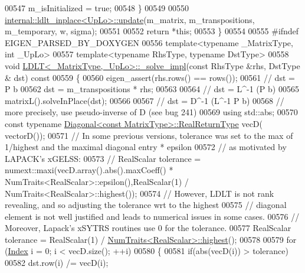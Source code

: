 \begin{DoxyCode}
00547     m\_isInitialized = \textcolor{keyword}{true};
00548   \}
00549 
00550   \hyperlink{struct_eigen_1_1internal_1_1ldlt__inplace}{internal::ldlt\_inplace<UpLo>::update}(m\_matrix, m\_transpositions, 
      m\_temporary, w, sigma);
00551 
00552   \textcolor{keywordflow}{return} *\textcolor{keyword}{this};
00553 \}
00554 
00555 \textcolor{preprocessor}{#ifndef EIGEN\_PARSED\_BY\_DOXYGEN}
00556 \textcolor{keyword}{template}<\textcolor{keyword}{typename} \_MatrixType, \textcolor{keywordtype}{int} \_UpLo>
00557 \textcolor{keyword}{template}<\textcolor{keyword}{typename} RhsType, \textcolor{keyword}{typename} DstType>
00558 \textcolor{keywordtype}{void} \hyperlink{group___cholesky___module_class_eigen_1_1_l_d_l_t}{LDLT<\_MatrixType,\_UpLo>::\_solve\_impl}(\textcolor{keyword}{const} RhsType &rhs, DstType &
      dst)\textcolor{keyword}{ const}
00559 \textcolor{keyword}{}\{
00560   eigen\_assert(rhs.rows() == rows());
00561   \textcolor{comment}{// dst = P b}
00562   dst = m\_transpositions * rhs;
00563 
00564   \textcolor{comment}{// dst = L^-1 (P b)}
00565   matrixL().solveInPlace(dst);
00566 
00567   \textcolor{comment}{// dst = D^-1 (L^-1 P b)}
00568   \textcolor{comment}{// more precisely, use pseudo-inverse of D (see bug 241)}
00569   \textcolor{keyword}{using} std::abs;
00570   \textcolor{keyword}{const} \textcolor{keyword}{typename} \hyperlink{group___core___module_class_eigen_1_1_diagonal}{Diagonal<const MatrixType>::RealReturnType} vecD(
      vectorD());
00571   \textcolor{comment}{// In some previous versions, tolerance was set to the max of 1/highest and the maximal diagonal entry *
       epsilon}
00572   \textcolor{comment}{// as motivated by LAPACK's xGELSS:}
00573   \textcolor{comment}{// RealScalar tolerance = numext::maxi(vecD.array().abs().maxCoeff() *
       NumTraits<RealScalar>::epsilon(),RealScalar(1) / NumTraits<RealScalar>::highest());}
00574   \textcolor{comment}{// However, LDLT is not rank revealing, and so adjusting the tolerance wrt to the highest}
00575   \textcolor{comment}{// diagonal element is not well justified and leads to numerical issues in some cases.}
00576   \textcolor{comment}{// Moreover, Lapack's xSYTRS routines use 0 for the tolerance.}
00577   RealScalar tolerance = RealScalar(1) / \hyperlink{group___core___module_struct_eigen_1_1_num_traits}{NumTraits<RealScalar>::highest}();
00578 
00579   \textcolor{keywordflow}{for} (\hyperlink{group___cholesky___module_ad9c57eb2fb3bbccd51b9d2e111bea355}{Index} i = 0; i < vecD.size(); ++i)
00580   \{
00581     \textcolor{keywordflow}{if}(abs(vecD(i)) > tolerance)
00582       dst.row(i) /= vecD(i);

\end{DoxyCode}
